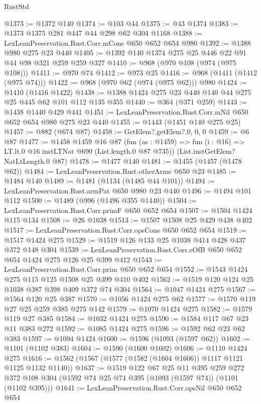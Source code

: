 \begin{lexlean}{RustStd}
\begin{coremodule}
{\begin{coremodule}
{{{{{{{@1373 := @1372 @140
@1374 := @103 @44
@1375 := @43 @1374
@1383 := @1373 @1375 @281 @447 @44 @298 @62 @304 @1168
@1388 := LexLeanPreservation.Rust.Corr.mCons @650 @652 @654 @980
@1392 := @1388 @980 @275 @23 @440
@1405 := @1392 @140 @1374 @275 @25 @446 @22 @91 @44 @98 @321 @259 @259 @327
@1410 := @968 (@970 @108 (@974 (@975 @108)))
@1411 := @970 @74
@1412 := @973 @25
@1416 := @968 (@1411 (@1412 (@975 @74)))
@1422 := @968 (@970 @62 (@974 (@975 @62))) @980
@1424 := @1410 (@1416 @1422)
@1438 := @1388 @1424 @275 @23 @440 @140 @44 @275 @25 @445 @62 @101 @112 @135 @355
@1440 := @364 (@371 @259)
@1443 := @1438 @1440 @429 @441
@1451 := LexLeanPreservation.Rust.Corr.mNil @650 @652 @654 @980 @275 @23 @440
@1455 := @1443 (@1451 @140 @275 @25)
@1457 := @882 (@674 @87)
@1458 := GetElem?.getElem?.{0, 0, 0}
@1459 := @6 @87
@1477 := @1458
    @1459
    @16
    @87
    (fun (as : @1459) => fun (i : @16) => LT.lt.{0} @16 instLTNat @690 (List.length.{0} @87 @735))
    (List.instGetElem?NatLtLength.{0} @87)
@1478 := @1477 @140
@1481 := @1455 (@1457 (@1478 @62))
@1484 := LexLeanPreservation.Rust.otherArms @650 @23
@1485 := @1484 @140
@1489 := @1481 (@1134 (@1485 @44 @101))
@1494 := LexLeanPreservation.Rust.armPat @650 @980 @23 @440
@1496 := @1494 @101 @112
@1500 := @1489 (@996 (@1496 @355 @1440))
@1504 := LexLeanPreservation.Rust.Corr.primF @650 @652 @654
@1507 := @1504 @1424 @115 @134
@1508 := @26 @1038
@1513 := @1507 @1508 @25 @429 @438 @402
@1517 := LexLeanPreservation.Rust.Corr.opsCons @650 @652 @654
@1519 := @1517 @1424 @275
@1529 := @1519 @126 @133 @25 @1038 @414 @428 @437 @372 @148 @304
@1539 := LexLeanPreservation.Rust.Corr.eOfB @650 @652 @654 @1424 @275 @126 @25 @399 @412
@1543 := LexLeanPreservation.Rust.Corr.prim @650 @652 @654
@1552 := @1543 @1424 @275 @115 @125 @1508 @25 @399 @410 @402
@1562 := @1519 @120 @124 @25 @1038 @387 @398 @409 @372 @74 @304
@1564 := @1047 @1424 @275
@1567 := @1564 @120 @25 @387
@1570 := @1056 @1424 @275 @62
@1577 := @1570 @119 @27 @25 @259 @385 @275 @142
@1579 := @1070 @1424 @275
@1582 := @1579 @119 @27 @385
@1584 := @1032 @1424 @275
@1590 := @1584 @117 @67 @23 @11 @383 @272
@1592 := @1085 @1424 @275
@1596 := @1592 @62 @23 @62 @383
@1597 := @1094 @1424
@1600 := @1596 (@1093 (@1597 @62))
@1602 := @1101 (@1102 @383)
@1604 := @1590 (@1600 @1602)
@1606 := @1110 @1424 @275
@1616 := @1562 (@1567 (@1577 (@1582 (@1604 @1606)) @1117 @1121 @1125 @1132 @1140))
@1637 := @1519
    @122
    @67
    @25
    @11
    @395
    @259
    @272
    @372
    @108
    @304
    (@1592 @74 @25 @74 @395 (@1093 (@1597 @74)) (@1101 (@1102 @395)))
@1641 := LexLeanPreservation.Rust.Corr.opsNil @650 @652 @654
}}}}}}}
\end{coremodule}}
\end{coremodule}
\end{lexlean}
